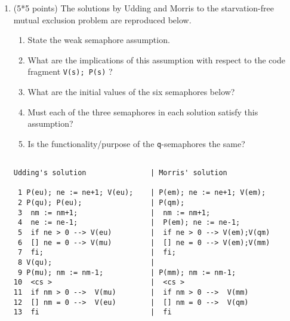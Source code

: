 \documentclass[12pt]{article}
\newcommand{\co}{{\bf co}}
\newcommand{\oc}{{\bf oc}}
\newcommand{\pa}{{$\parallel$}}
\newcommand{\lb}{$\langle$}
\newcommand{\rb}{$\rangle$}
\newcommand{\ra}{$\rightarrow$}
\newcommand{\await}{{\bf await}}
\begin{document}
\begin{enumerate}
\begin{enumerate}
\item
Consider the following program segment:

\begin{tabbing}
\co\= \lb \await0\= $x \geq 3$ \=\ra0\= $x := x - 3$ \rb\kill
\co\> \lb \await \> $x \geq 3$ \>\ra \>$x := x - 3$ \rb\\
\pa\> \lb \await \> $x \geq 2$ \>\ra \>$x := x - 2$ \rb\\
\pa\> \lb \await \> $x = 1$ \>\ra \>$x := x + 5$ \rb\\
\oc
\end{tabbing}

Let $P$ be a predicate that characterizes the weakest deadloc-free
precondition for the program, i.e., the largest set of states such
that, if the program is begun in a state satisfying $P$, then it will
terminate if scheduling is weakly-fair.  Determine $P$.  Explain your
answer.
\end{enumerate}


\item (5*5 points)
The solutions by Udding and Morris to the starvation-free mutual exclusion problem are reproduced below.
\begin{enumerate}
\item State the weak semaphore assumption.
\item What are the implications of this assumption with respect to
the code fragment {\tt V(s); P(s)} ? 
\item What are the initial values of the six semaphores below?
\item
Must each of the three semaphores in each solution satisfy this assumption?
\item Is the functionality/purpose of the {\tt q}-semaphores the same? 
\end{enumerate}

\begin{verbatim}

Udding's solution               | Morris' solution

 1 P(eu); ne := ne+1; V(eu);    | P(em); ne := ne+1; V(em);
 2 P(qu); P(eu);                | P(qm);
 3  nm := nm+1;                 |  nm := nm+1;             
 4  ne := ne-1;                 |  P(em); ne := ne-1;
 5  if ne > 0 --> V(eu)         |  if ne > 0 --> V(em);V(qm)
 6  [] ne = 0 --> V(mu)         |  [] ne = 0 --> V(em);V(mm)
 7  fi;                         |  fi;
 8 V(qu);                       |
 9 P(mu); nm := nm-1;           | P(mm); nm := nm-1;             
10  <cs >                       |  <cs >                   
11  if nm > 0 -->  V(mu)        |  if nm > 0 -->  V(mm) 
12  [] nm = 0 -->  V(eu)        |  [] nm = 0 -->  V(qm) 
13  fi                          |  fi
\end{verbatim}


\end{enumerate}
\end{document}
